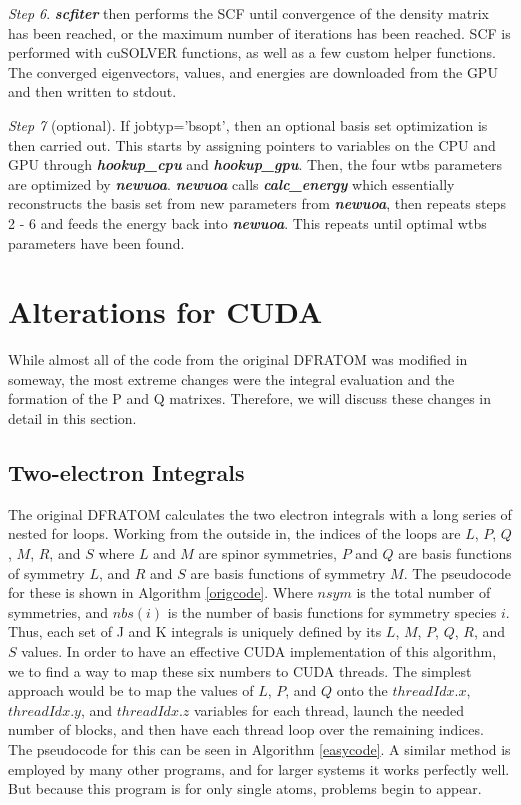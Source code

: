 \documentclass[12pt]{report}
\begin{document}
\textit{Step 6}. \textit{\textbf{scfiter}} then performs the SCF until convergence of the density matrix has been reached, or the maximum number of iterations has been reached. SCF is performed with cuSOLVER functions, as well as a few custom helper functions. The converged eigenvectors, values, and energies are downloaded from the GPU and then written to stdout.

\textit{Step 7} (optional). If jobtyp='bsopt', then an optional basis set optimization is then carried out. This starts by assigning pointers to variables on the CPU and GPU through \textit{\textbf{hookup\_cpu}} and \textit{\textbf{hookup\_gpu}}. Then, the four wtbs parameters are optimized by \textit{\textbf{newuoa}}. \textit{\textbf{newuoa}} calls \textit{\textbf{calc\_energy}} which essentially reconstructs the basis set from new parameters from \textit{\textbf{newuoa}}, then repeats steps 2 - 6 and feeds the energy back into \textit{\textbf{newuoa}}. This repeats until optimal wtbs parameters have been found.

\section{Alterations for CUDA}
While almost all of the code from the original DFRATOM was modified in someway, the most extreme changes were the integral evaluation and the formation of the P and Q matrixes. Therefore, we will discuss these changes in detail in this section.

\subsection{Two-electron Integrals}
The original DFRATOM calculates the two electron integrals with a long series of nested for loops. Working from the outside in, the indices of the loops are $L$, $P$, $Q$, $M$, $R$, and $S$ where $L$ and $M$ are spinor symmetries, $P$ and $Q$ are basis functions of symmetry $L$, and $R$ and $S$ are basis functions of symmetry $M$. The pseudocode for these is shown in Algorithm \ref{origcode}. Where $nsym$ is the total number of symmetries, and $nbs(i)$ is the number of basis functions for symmetry species $i$. Thus, each set of J and K integrals is uniquely defined by its $L$, $M$, $P$, $Q$, $R$, and $S$ values. In order to have an effective CUDA implementation of this algorithm, we to find a way to map these six numbers to CUDA threads. The simplest approach would be to map the values of $L$, $P$, and $Q$ onto the $threadIdx.x$, $threadIdx.y$, and $threadIdx.z$ variables for each thread, launch the needed number of blocks, and then have each thread loop over the remaining indices. The pseudocode for this can be seen in Algorithm \ref{easycode}. A similar method is employed by many other programs, and for larger systems it works perfectly well. But because this program is for only single atoms, problems begin to appear.
\end{document}
